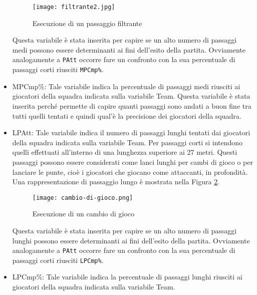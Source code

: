 \begin{itemize}
	\begin{figure}[ht]
		\begin{center}
			\texttt{[image: filtrante2.jpg]}
			\caption{Esecuzione di un passaggio filtrante} \label{fig:filt}
		\end{center}
	\end{figure}

	Questa variabile è stata inserita per capire se un alto numero di passaggi medi possono essere determinanti ai fini dell'esito della partita. Ovviamente analogamente a \texttt{PAtt} occorre fare un confronto con la sua percentuale di passaggi corti riusciti \texttt{MPCmp\%}.

	\item \textsf{MPCmp\%}: Tale variabile indica la percentuale di passaggi medi riusciti ai giocatori della squadra indicata sulla variabile \textsf{Team}. Questa variabile è stata inserita perché permette di capire quanti passaggi sono andati a buon fine tra tutti quelli tentati e quindi qual'è la precisione dei giocatori della squadra.
	\item \textsf{LPAtt}: Tale variabile indica il numero di passaggi lunghi tentati dai giocatori della squadra indicata sulla variabile \textsf{Team}. Per passaggi corti si intendono quelli effettuati all'interno di una lunghezza superiore ai 27 metri. Questi passaggi possono essere considerati come lanci lunghi per cambi di gioco o per lanciare le punte, cioè i giocatori che giocano come attaccanti, in profondità. Una rappresentazione di passaggio lungo è mostrata nella Figura \ref{fig:cambio}.
	\begin{figure}[ht]
		\begin{center}
			\texttt{[image: cambio-di-gioco.png]}
			\caption{Esecuzione di un cambio di gioco} \label{fig:cambio}
		\end{center}
	\end{figure}
	
	Questa variabile è stata inserita per capire se un alto numero di passaggi lunghi possono essere determinanti ai fini dell'esito della partita. Ovviamente analogamente a \texttt{PAtt} occorre fare un confronto con la sua percentuale di passaggi corti riusciti \texttt{LPCmp\%}.

	\item \textsf{LPCmp\%}: Tale variabile indica la percentuale di passaggi lunghi riusciti ai giocatori della squadra indicata sulla variabile \textsf{Team}. 
	

\end{itemize}
